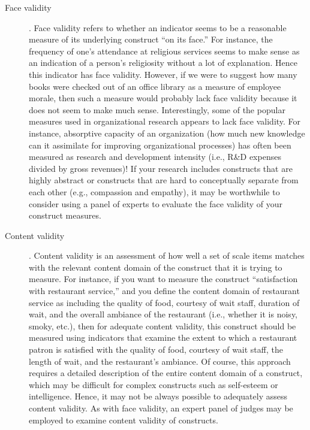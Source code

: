 \begin{description}
	\item[Face validity]. Face validity refers to whether an indicator seems to be a reasonable measure of its underlying construct ``on its face.'' For instance, the frequency of one's attendance at religious services seems to make sense as an indication of a person's religiosity without a lot of explanation. Hence this indicator has face validity. However, if we were to suggest how many books were checked out of an office library as a measure of employee morale, then such a measure would probably lack face validity because it does not seem to make much sense. Interestingly, some of the popular measures used in organizational research appears to lack face validity. For instance, absorptive capacity of an organization (how much new knowledge can it assimilate for improving organizational processes) has often been measured as research and development intensity (i.e., R\&D expenses divided by gross revenues)! If your research includes constructs that are highly abstract or constructs that are hard to conceptually separate from each other (e.g., compassion and empathy), it may be worthwhile to consider using a panel of experts to evaluate the face validity of your construct measures.


	\item[Content validity]. Content validity is an assessment of how well a set of scale items matches with the relevant content domain of the construct that it is trying to measure. For instance, if you want to measure the construct ``satisfaction with restaurant service,'' and you define the content domain of restaurant service as including the quality of food, courtesy of wait staff, duration of wait, and the overall ambiance of the restaurant (i.e., whether it is noisy, smoky, etc.), then for adequate content validity, this construct should be measured using indicators that examine the extent to which a restaurant patron is satisfied with the quality of food, courtesy of wait staff, the length of wait, and the restaurant's ambiance. Of course, this approach requires a detailed description of the entire content domain of a construct, which may be difficult for complex constructs such as self-esteem or intelligence. Hence, it may not be always possible to adequately assess content validity. As with face validity, an expert panel of judges may be employed to examine content validity of constructs.


\end{description}
